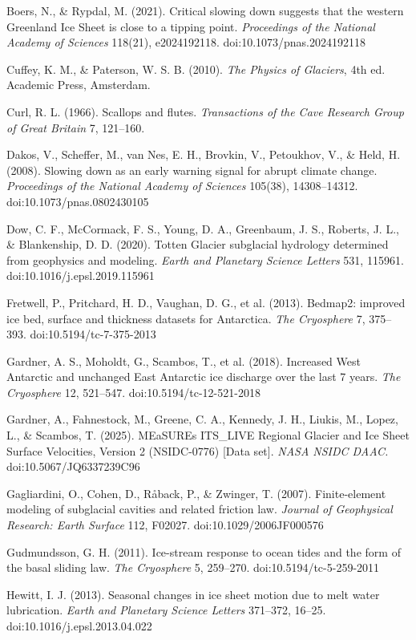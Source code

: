 \documentclass[11pt]{article}
\begin{document}
Boers, N., \& Rypdal, M. (2021). Critical slowing down suggests that the western Greenland Ice Sheet is close to a tipping point. \emph{Proceedings of the National Academy of Sciences} 118(21), e2024192118. doi:10.1073/pnas.2024192118


Cuffey, K. M., \& Paterson, W. S. B. (2010). \emph{The Physics of Glaciers}, 4th ed. Academic Press, Amsterdam.


Curl, R. L. (1966). Scallops and flutes. \emph{Transactions of the Cave Research Group of Great Britain} 7, 121–160.


Dakos, V., Scheffer, M., van Nes, E. H., Brovkin, V., Petoukhov, V., \& Held, H. (2008). Slowing down as an early warning signal for abrupt climate change. \emph{Proceedings of the National Academy of Sciences} 105(38), 14308–14312. doi:10.1073/pnas.0802430105


Dow, C. F., McCormack, F. S., Young, D. A., Greenbaum, J. S., Roberts, J. L., \& Blankenship, D. D. (2020). Totten Glacier subglacial hydrology determined from geophysics and modeling. \emph{Earth and Planetary Science Letters} 531, 115961. doi:10.1016/j.epsl.2019.115961


Fretwell, P., Pritchard, H. D., Vaughan, D. G., et al. (2013). Bedmap2: improved ice bed, surface and thickness datasets for Antarctica. \emph{The Cryosphere} 7, 375–393. doi:10.5194/tc-7-375-2013


Gardner, A. S., Moholdt, G., Scambos, T., et al. (2018). Increased West Antarctic and unchanged East Antarctic ice discharge over the last 7 years. \emph{The Cryosphere} 12, 521–547. doi:10.5194/tc-12-521-2018


Gardner, A., Fahnestock, M., Greene, C. A., Kennedy, J. H., Liukis, M., Lopez, L., \& Scambos, T. (2025). MEaSUREs ITS\_LIVE Regional Glacier and Ice Sheet Surface Velocities, Version 2 (NSIDC-0776) [Data set]. \emph{NASA NSIDC DAAC.} doi:10.5067/JQ6337239C96


Gagliardini, O., Cohen, D., Råback, P., \& Zwinger, T. (2007). Finite-element modeling of subglacial cavities and related friction law. \emph{Journal of Geophysical Research: Earth Surface} 112, F02027. doi:10.1029/2006JF000576


Gudmundsson, G. H. (2011). Ice-stream response to ocean tides and the form of the basal sliding law. \emph{The Cryosphere} 5, 259–270. doi:10.5194/tc-5-259-2011


Hewitt, I. J. (2013). Seasonal changes in ice sheet motion due to melt water lubrication. \emph{Earth and Planetary Science Letters} 371–372, 16–25. doi:10.1016/j.epsl.2013.04.022
\end{document}
